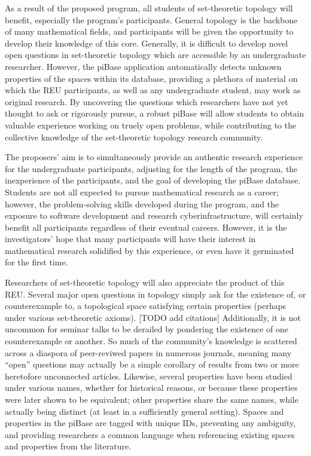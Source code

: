   As a result of the proposed program, all students of set-theoretic topology
  will benefit, especially the program's participants. General topology
  is the backbone of many mathematical fields, and participants will be
  given the opportunity to develop their knowledge of this core.
  Generally, it is difficult to develop novel open questions in set-theoretic
  topology which are accessible by an undergraduate researcher. However,
  the piBase application automatically detects unknown properties of
  the spaces within its database, providing a plethora of material
  on which the REU participants, as well as any undergraduate student, may
  work as original research. By uncovering the questions which researchers
  have not yet thought to ask or rigorously pursue, a robust piBase
  will allow students to obtain valuable experience working on truely
  open problems, while contributing to the collective knowledge of the
  set-theoretic topology research community.

  The proposers' aim is to simultaneously provide an authentic research
  experience for the undergraduate participants, adjusting for the length of
  the program, the inexperience of the participants, and the goal of
  developing the piBase database. Students are not all expected to pursue
  mathematical research as a career; however, the problem-solving skills
  developed during the program, and the exposure to software
  development and research cyberinfrastructure, will certainly benefit all
  participants regardless of their eventual careers. However, it is
  the investigators' hope that many participants will have their interest
  in mathematical research solidified by this experience, or even have it
  germinated for the first time.

  Researchers of set-theoretic topology will also appreciate the product
  of this REU. Several major open questions in topology simply ask for
  the existence of, or counterexample to, a topological space satisfying
  certain properties (perhaps under various set-theoretic axioms).
  [TODO add citations]
  Additionally, it is not uncommon for seminar talks to be derailed by
  pondering the existence of one counterexample or another. So much
  of the community's knowledge is scattered across
  a diaspora of peer-reviwed papers in numerous journals, meaning many
  ``open'' questions may actually be a simple corollary of results from
  two or more heretofore unconnected articles. Likewise, several properties
  have been
  studied under various names, whether for historical reasons, or because
  these properties were later shown to be equivalent; other properties share
  the same names, while actually being distinct (at least in a sufficiently
  general setting). Spaces and properties in the piBase are tagged with
  unique IDs, preventing any ambiguity, and providing researchers a common
  language when referencing existing spaces and properties from the literature.

